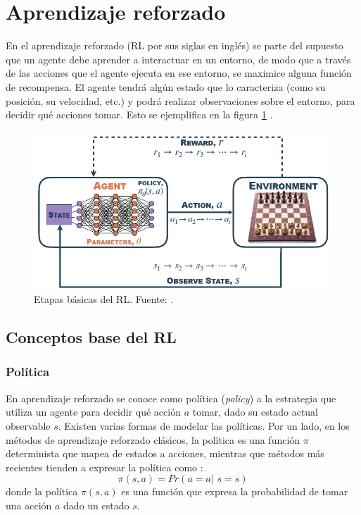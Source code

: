 \section{Aprendizaje reforzado}

En el aprendizaje reforzado (RL por sus siglas en inglés) se parte del supuesto que un agente debe aprender a interactuar en un entorno, de modo que a través de las acciones que el agente ejecuta en ese entorno, se maximice alguna función de recompensa. El agente tendrá algún estado que lo caracteriza (como su posición, su velocidad, etc.) y podrá realizar observaciones sobre el entorno, para decidir qué acciones tomar. Esto se ejemplifica en la figura \ref{fig:esquemaRL} \cite{DataScience}.

\begin{figure}[hh]
	\centering
	\includegraphics[scale=0.5]{fig/new/ReinforcementLearning.png}
	\caption{Etapas básicas del RL. Fuente: \cite{DataScience}.}
	\label{fig:esquemaRL}
\end{figure}

\subsection{Conceptos base del RL}

\subsubsection{Política}

En aprendizaje reforzado se conoce como política (\textit{policy}) a la estrategia que utiliza un agente para decidir qué acción $a$ tomar, dado su estado actual observable $s$. Existen varias formas de modelar las políticas. Por un lado, en los métodos de aprendizaje reforzado clásicos, la política es una función $\pi$ determinista que mapea de estados a acciones, mientras que métodos más recientes tienden a expresar la política como  \cite{DataScience}:
\begin{equation}
\pi (s,a) = Pr(a=a|\,\, s=s)
\label{ecu:policy}
\end{equation}
donde la política $\pi (s,a)$ es una función que expresa la probabilidad de tomar una acción $a$ dado un estado $s$.


